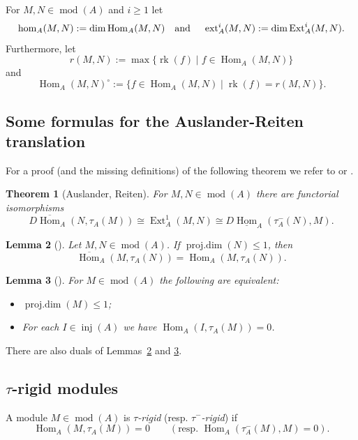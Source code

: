 \documentclass[12pt,reqno]{amsart}
\newtheorem{Thm}{Theorem}[section]
\newtheorem{Lem}[Thm]{Lemma}
\theoremstyle{definition}
\newcommand{\rk}{\operatorname{rk}}
\newcommand{\md}{\operatorname{mod}}
\newcommand{\pdim}{\operatorname{proj.dim}}
\newcommand{\inj}{\operatorname{inj}}
\newcommand{\Hom}{\operatorname{Hom}}
\newcommand{\Ext}{\operatorname{Ext}}
\newcommand{\ext}{\operatorname{ext}}
\begin{document}
For $M,N \in \md(A)$ and $i \ge 1$ let
$$
\hom_A(M,N) := \dim \Hom_A(M,N)
\text{\quad and \quad}
\ext_A^i(M,N) := \dim \Ext_A^i(M,N).
$$
Furthermore, let
$$
r(M,N) := \max\{ \rk(f) \mid f \in \Hom_A(M,N) \}
$$
and
$$
\Hom_A(M,N)^\circ :=
\{ f \in \Hom_A(M,N) \mid \rk(f) = r(M,N) \}.
$$

\subsection{Some formulas for the Auslander-Reiten translation}
For a proof (and the missing definitions) of the following theorem
we refer to \cite[Section~IV.4]{ARS97} or
\cite[Section~III.6]{SY11}.


\begin{Thm}[{Auslander, Reiten}]\label{thm:ARformulas}
For $M,N \in \md(A)$ there are functorial isomorphisms
$$
D\overline{\Hom}_A(N,\tau_A(M)) \cong \Ext_A^1(M,N) \cong D\underline{\Hom}_A(\tau_A^-(N),M).
$$
\end{Thm}

\begin{Lem}[{\cite[Section~IV.4]{ARS97}}]\label{lem:pdim1stable}
Let $M,N \in \md(A)$.
If $\pdim(N) \le 1$, then
$$
\overline{\Hom}_A(M,\tau_A(N)) = \Hom_A(M,\tau_A(N)).
$$
\end{Lem}


\begin{Lem}[{\cite[Section~III.5]{SY11}}]\label{lem:pdim1}
For $M \in \md(A)$
the following are equivalent:
%
\begin{itemize}\itemsep2mm

\item[(i)]
$\pdim(M) \le 1$;

\item[(ii)]
For each $I \in \inj(A)$ we have
$\Hom_A(I,\tau_A(M)) = 0$.

\end{itemize}
%
\end{Lem}



There are also duals of Lemmas~\ref{lem:pdim1stable}
and \ref{lem:pdim1}.



\subsection{$\tau$-rigid modules}
A module $M \in \md(A)$ is
\emph{$\tau$-rigid} (resp. \emph{$\tau^-$-rigid})
if
$$
\Hom_A(M,\tau_A(M)) = 0
\qquad (\text{resp. } \Hom_A(\tau_A^-(M),M) = 0).
$$
\end{document}
